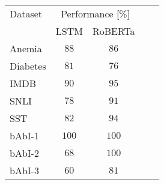 \documentclass{standalone}
\begin{document}
\centering
\begin{tabular}{l c c c c}
    \toprule
    Dataset & \multicolumn{2}{c}{Performance [\%]} \\
    \cmidrule(r){2-3}
    & LSTM & RoBERTa \\
    \midrule
    Anemia & $88$ & $86$ \\
    Diabetes & $81$ & $76$ \\
    IMDB & $90$ & $95$ \\
    SNLI & $78$ & $91$ \\
    SST & $82$ & $94$ \\
    bAbI-1 & $100$ & $100$ \\
    bAbI-2 & $68$ & $100$ \\
    bAbI-3 & $60$ & $81$ \\
    \bottomrule
\end{tabular}
\endminipage
\end{document}
